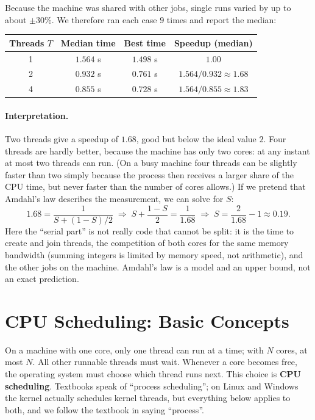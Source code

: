 \documentclass[11pt,a4paper]{article}
\newcommand{\term}[1]{\textbf{\color{mintdeep}#1}}
\begin{document}
Because the machine was shared with other jobs, single runs varied by up to about $\pm 30\%$. We therefore ran each case $9$ times and report the median:

\begin{center}
\renewcommand{\arraystretch}{1.3}
\begin{tabular}{@{}cccc@{}}
\toprule
\textbf{Threads $T$} & \textbf{Median time} & \textbf{Best time} & \textbf{Speedup (median)} \\
\midrule
1 & $1.564$ s & $1.498$ s & $1.00$ \\
2 & $0.932$ s & $0.761$ s & $1.564/0.932 \approx 1.68$ \\
4 & $0.855$ s & $0.728$ s & $1.564/0.855 \approx 1.83$ \\
\bottomrule
\end{tabular}
\end{center}

\paragraph{Interpretation.} Two threads give a speedup of $1.68$, good but below the ideal value $2$. Four threads are hardly better, because the machine has only two cores: at any instant at most two threads can run. (On a busy machine four threads can be slightly faster than two simply because the process then receives a larger share of the CPU time, but never faster than the number of cores allows.) If we pretend that Amdahl's law describes the measurement, we can solve for $S$:
\[
1.68 = \frac{1}{S + (1-S)/2} \;\Longrightarrow\; S + \frac{1-S}{2} = \frac{1}{1.68} \;\Longrightarrow\; S = \frac{2}{1.68} - 1 \approx 0.19 .
\]
Here the ``serial part'' is not really code that cannot be split: it is the time to create and join threads, the competition of both cores for the same memory bandwidth (summing integers is limited by memory speed, not arithmetic), and the other jobs on the machine. Amdahl's law is a model and an upper bound, not an exact prediction.


\section{CPU Scheduling: Basic Concepts}

On a machine with one core, only one thread can run at a time; with $N$ cores, at most $N$. All other runnable threads must wait. Whenever a core becomes free, the operating system must choose which thread runs next. This choice is \term{CPU scheduling}. Textbooks speak of ``process scheduling''; on Linux and Windows the kernel actually schedules kernel threads, but everything below applies to both, and we follow the textbook in saying ``process''.
\end{document}
